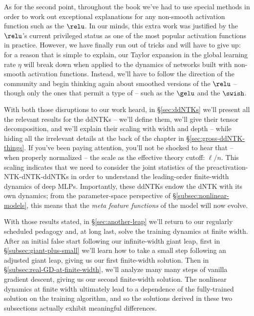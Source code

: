 As for the second
point,
throughout the book we've had to use special methods in order to work out exceptional explanations for any non-smooth activation function such as the $\relu$. In our minds, this extra work was justified by the $\relu$'s current privileged status as one of the most popular activation functions in practice. 
However, we have finally run out of tricks and will have to give up: for a reason that is simple to explain, our Taylor expansion in the global learning rate $\eta$ will break down when applied to the dynamics of networks built with non-smooth activation functions.
Instead, we'll have to follow the direction of the community and begin thinking again about smoothed versions of the $\relu$ -- though only the ones that permit a type of  -- such as the $\gelu$ and the $\swish$.

With both those disruptions to our work heard, in \S\ref{sec:ddNTKs} we'll present all the relevant results for the ddNTKs -- we'll define them, we'll give their tensor decomposition, and we'll explain their scaling with width and depth -- while hiding all the irrelevant details at the back of the chapter in \S\ref{sec:gross-ddNTK-things}. 
If you've been paying attention, you'll not be shocked to hear that -- when properly normalized -- the  scale as the effective theory cutoff:  $\ell/n$. 
This scaling indicates that we need to consider the joint statistics of the preactivation-NTK-dNTK-ddNTKs in order to understand the leading-order finite-width dynamics of deep MLPs. 
Importantly, these ddNTKs endow the dNTK with its own dynamics; from the parameter-space perspective of \S\ref{subsec:nonlinear-models}, this means that the \emph{meta feature functions} of the model will now evolve.






With those results stated, in \S\ref{sec:another-leap} we'll return to our regularly scheduled pedagogy and, at long last,
solve the training dynamics at finite width. 
After an initial false start following our infinite-width giant leap, first in  \S\ref{subsec:giant-plus-small} we'll learn how to take a small step following an adjusted  giant leap,
giving us our first finite-width solution.
Then in \S\ref{subsec:real-GD-at-finite-width}, we'll analyze many many steps of vanilla gradient descent, giving us our second finite-width solution. The nonlinear dynamics at finite width ultimately lead to a dependence of the fully-trained solution on the training algorithm, and so the solutions derived in these two subsections actually exhibit meaningful differences. 

